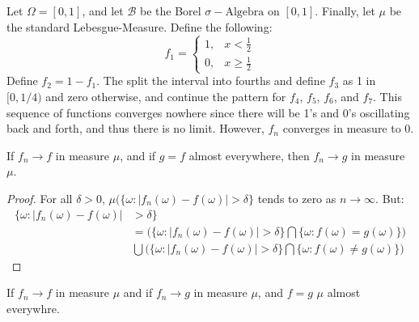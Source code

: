     \begin{example}
        Let $\Omega=[0,1]$, and let $\mathcal{B}$ be
        the Borel $\sigma-\textrm{Algebra}$ on
        $[0,1]$. Finally, let $\mu$ be the standard
        Lebesgue-Measure. Define the following:
        \begin{equation}
            f_{1}=
            \begin{cases}
                1,&x<\frac{1}{2}\\
                0,&x\geq\frac{1}{2}
            \end{cases}
        \end{equation}
        Define $f_{2}=1-f_{1}$. The split the
        interval into fourths and define
        $f_{3}$ as 1 in $[0,1/4)$ and zero otherwise,
        and continue the pattern for $f_{4}$, $f_{5}$,
        $f_{6}$, and $f_{7}$. This sequence of functions
        converges nowhere since there will be 1's and
        0's oscillating back and forth, and thus there
        is no limit. However, $f_{n}$ converges in
        measure to 0.
    \end{example}
    \begin{theorem}
        If $f_{n}\rightarrow{f}$ in measure $\mu$,
        and if $g=f$ almost everywhere, then
        $f_{n}\rightarrow{g}$ in measure $\mu$.
    \end{theorem}
    \begin{proof}
        For all $\delta>0$,
        $\mu(\{\omega:|f_{n}(\omega)-f(\omega)|>\delta\}$
        tends to zero as $n\rightarrow\infty$. But:
        \begin{equation}
            \begin{split}
                \{\omega:|f_{n}(\omega)-f(\omega)|
                &>\delta\}\\
                &=\Big(
                    \{\omega:|f_{n}(\omega)-f(\omega)|>\delta\}
                    \bigcap
                    \{\omega:f(\omega)=g(\omega)\}
                \Big)\\
                &\bigcup\Big(
                    \{\omega:|f_{n}(\omega)-f(\omega)|>\delta\}
                    \bigcap
                    \{\omega:f(\omega)\ne{g}(\omega)\}
                \Big)
            \end{split}
        \end{equation}
    \end{proof}
    \begin{theorem}
        If $f_{n}\rightarrow{f}$ in measure $\mu$ and if
        $f_{n}\rightarrow{g}$ in measure $\mu$, and
        $f=g$ $\mu$ almost everywhre.
    \end{theorem}
